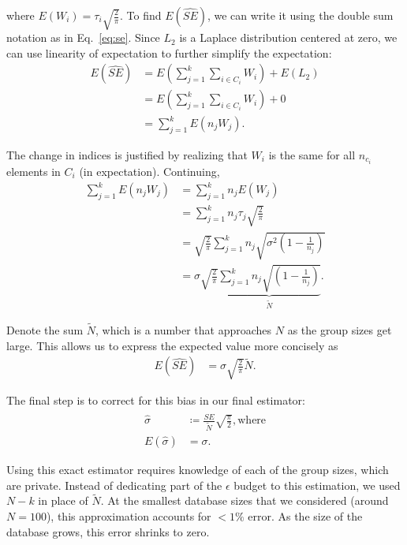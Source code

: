 \noindent where $E(W_i) = \tau_i \sqrt{\frac{2}{\pi}}$.  To find $E(\widehat{SE})$, we can write it using the double sum notation as in Eq.~\eqref{eq:se}. Since $L_2$ is a Laplace distribution centered at zero, we can use linearity of expectation to further simplify the expectation:
\begin{align*}
E(\widehat{SE}) &= E\left(\sum_{j=1}^k \sum_{i \in C_i} W_i\right)+ E(L_2)\\
&= E\left(\sum_{j=1}^k \sum_{i \in C_i} W_i \right) + 
0\\
&= \sum_{j=1}^k E\left(n_j W_j \right).
\end{align*}

\noindent The change in indices is justified by realizing that $W_i$ is the same for all $n_{c_i}$ elements in $C_i$ (in expectation). Continuing,
\begin{align*}
\sum_{j=1}^k E\left(n_j W_j \right) &= \sum_{j=1}^k n_j E\left(W_j \right) \\
&= \sum_{j=1}^k n_j \tau_j \sqrt{\frac{2}{\pi}} \\
&= \sqrt{\frac{2}{\pi}} \sum_{j=1}^k n_j \sqrt{\sigma^2\left(1 - \frac{1}{n_j}\right)}  \\
&= \sigma \sqrt{\frac{2}{\pi}} \underbrace{\sum_{j=1}^k n_j \sqrt{\left(1 - \frac{1}{n_j}\right)}}_{\tilde{N}}.
\end{align*}

\noindent Denote the sum $\tilde{N}$, which is a number that approaches $N$ as the group sizes get large. This allows us to express the expected value more concisely as
\begin{align*}
E(\widehat{SE}) &= \sigma \sqrt{\frac{2}{\pi}} \tilde{N}.
\end{align*}

The final step is to correct for this bias in our final estimator:
\begin{align*}
\hat{\sigma} &\coloneqq \frac{\widehat{SE}}{\tilde{N}}\sqrt{\frac{\pi}{2}}, \text{where}\\
E\left(\hat{\sigma}\right) &= \sigma.
\end{align*}

\noindent Using this exact estimator requires knowledge of each of the group sizes, which are private. Instead of dedicating part of the $\epsilon$ budget to this estimation, we used $N - k$ in place of $\tilde{N}$. At the smallest database sizes that we considered (around $N = 100$), this approximation accounts for $< 1\%$ error. As the size of the database grows, this error shrinks to zero.

